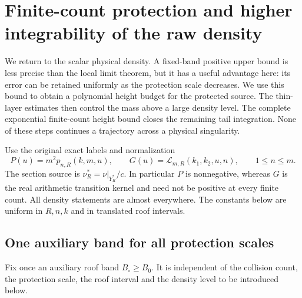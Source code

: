 \section{Finite-count protection and higher integrability of the raw density}
\label{sec:v54-density-integrability}
We return to the scalar physical density. A fixed-band positive upper
bound is less precise than the local limit theorem, but it has a useful
advantage here: its error can be retained uniformly as the protection
scale decreases. We use this bound to obtain a polynomial height budget
for the protected source. The thin-layer estimates then control the
mass above a large density level. The complete exponential finite-count
height bound closes the remaining tail integration. None of these
steps continues a trajectory across a physical singularity.

Use the original exact labels and normalization
\[
 P(u)=m^2p_{n,R}(k,m,u),\qquad
 G(u)=\mathcal L_{m,R}(k_1,k_2,u,n),\qquad 1\le n\le m.
\]
The section source is $\nu_R^*=\nu|_{Y_R^*}/c$. In particular $P$
is nonnegative, whereas $G$ is the real arithmetic transition kernel
and need not be positive at every finite count. All density statements
are almost everywhere. The constants below are uniform in $R,n,k$
and in translated roof intervals.

\subsection{One auxiliary band for all protection scales}
Fix once an auxiliary roof band $B_\circ\ge B_0$. It is independent
of the collision count, the protection scale, the roof interval and
the density level to be introduced below.

